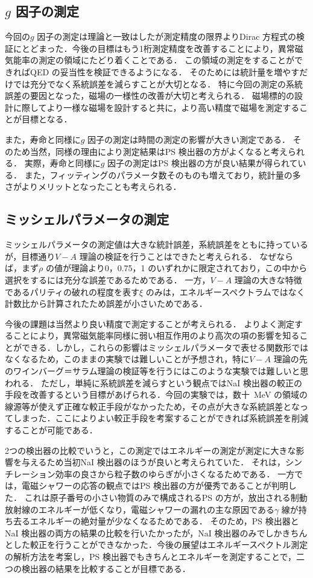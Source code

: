 \subsection{$g$ 因子の測定}
今回の$g$ 因子の測定は理論と一致はしたが測定精度の限界よりDirac 方程式の検証にとどまった．今後の目標はもう1桁測定精度を改善することにより，異常磁気能率の測定の領域にたどり着くことである．
この領域の測定をすることができればQED の妥当性を検証できるようになる．
そのためには統計量を増やすだけでは充分でなく系統誤差を減らすことが大切となる．
特に今回の測定の系統誤差の要因となった，磁場の一様性の改善が大切と考えられる．
磁場標的の設計に際してより一様な磁場を設計すると共に，より高い精度で磁場を測定することが目標となる．

また，寿命と同様に$g$ 因子の測定は時間の測定の影響が大きい測定である．
そのため当然，同様の理由により測定結果はPS 検出器の方がよくなると考えられる．
実際，寿命と同様に$g$ 因子の測定はPS 検出器の方が良い結果が得られている．
また，フィッティングのパラメータ数そのものも増えており，統計量の多さがよりメリットとなったことも考えられる．

\subsection{ミッシェルパラメータの測定}
ミッシェルパラメータの測定値は大きな統計誤差，系統誤差をともに持っているが，目標通り$V-A$ 理論の検証を行うことはできたと考えられる．
なぜならば，まず$\rho$ の値が理論より0，0.75，1 のいずれかに限定されており，この中から選択をするには充分な誤差であるためである．
一方，$V-A$ 理論の大きな特徴であるパリティの破れの程度を表す$\xi$ のみは，エネルギースペクトラムではなく計数比から計算されたため誤差が小さいためである．

今後の課題は当然より良い精度で測定することが考えられる．
よりよく測定することにより，異常磁気能率同様に弱い相互作用のより高次の項の影響を知ることができる．しかし，これらの影響はミッシェルパラメータで表せる関数形ではなくなるため，このままの実験では難しいことが予想され，特に$V-A$ 理論の先のワインバーグ＝サラム理論の検証等を行うにはこのような実験では難しいと思われる．
ただし，単純に系統誤差を減らすという観点ではNaI 検出器の較正の手段を改善するという目標があげられる．今回の実験では，数十~MeV の領域の線源等が使えず正確な較正手段がなかったため，その点が大きな系統誤差となってしまった．ここによりよい較正手段を考案することができれば系統誤差を削減することが可能である．

2つの検出器の比較でいうと，この測定ではエネルギーの測定が測定に大きな影響を与えるため当初NaI 検出器のほうが良いと考えられていた．
それは，シンチレーション効率の良さから粒子数のゆらぎが小さくなるためである．
一方では，電磁シャワーの応答の観点ではPS 検出器の方が優秀であることが判明した．
これは原子番号の小さい物質のみで構成されるPS の方が，放出される制動放射線のエネルギーが低くなり，電磁シャワーの漏れの主な原因である$\gamma$ 線が持ち去るエネルギーの絶対量が少なくなるためである．
そのため，PS 検出器とNaI 検出器の両方の結果の比較を行いたかったが，NaI 検出器のみでしかきちんとした較正を行うことができなかった．今後の展望はエネルギースペクトル測定の解析方法を考案し，PS 検出器でもきちんとエネルギーを測定することで，二つの検出器の結果を比較することが目標である．

